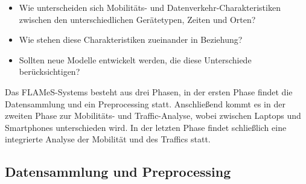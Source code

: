 \documentclass[12pt, a4paper]{article}
\begin{document}
\begin{itemize}
    \item Wie unterscheiden sich Mobilitäts- und Datenverkehr-Charakteristiken zwischen den unterschiedlichen Gerätetypen,
    Zeiten und Orten?
    \item Wie stehen diese Charakteristiken zueinander in Beziehung?
    \item Sollten neue Modelle entwickelt werden, die diese Unterschiede berücksichtigen?
\end{itemize}

Das FLAMeS-Systems besteht aus drei Phasen, in der ersten Phase findet die Datensammlung und ein Preprocessing statt.
Anschließend kommt es in der zweiten Phase zur Mobilitäts- und Traffic-Analyse, wobei zwischen Laptops und Smartphones
unterschieden wird. In der letzten Phase findet schließlich eine integrierte Analyse der Mobilität und des Traffics statt.

\subsection{Datensammlung und Preprocessing}
\end{document}
